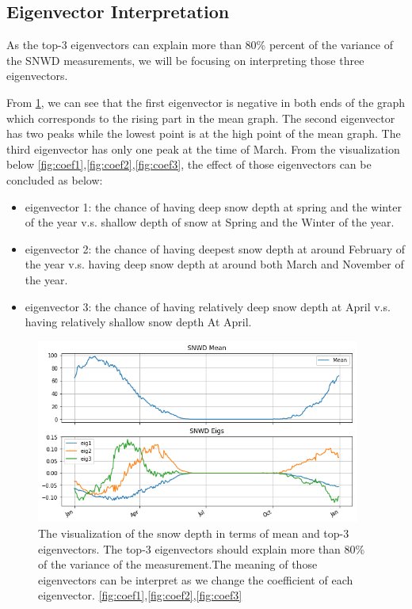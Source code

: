 \documentclass[a4paper]{article}
\begin{document}
\subsection{Eigenvector Interpretation}
As the top-3 eigenvectors can explain more than 80\% percent of the variance of the SNWD measurements, we will be focusing on interpreting those three eigenvectors.

From \ref{fig:eigen_snwd}, we can see that the first eigenvector is negative in both ends of the graph which corresponds to the rising part in the mean graph. The second eigenvector has two peaks while the lowest point is at the high point of the mean graph. The third eigenvector has only one peak at the time of March. 
\noindent From the visualization below \ref{fig:coef1},\ref{fig:coef2},\ref{fig:coef3}, the effect of those eigenvectors can be concluded as below:
\begin{itemize}
\item  eigenvector 1:  the chance of having deep snow depth at spring and the winter of the year v.s. shallow depth of snow at Spring and the Winter of the year.
\item  eigenvector 2: the chance of having deepest snow depth at around February of the year v.s. having deep snow depth at around both March and November of the year.
\item  eigenvector 3: the chance of having relatively deep snow depth at April v.s.  having relatively shallow snow depth At April.
\end{itemize}
\begin{figure}[!htp]
\centering
\includegraphics[width=0.95\textwidth]{SNWD.png}
\caption{\label{fig:eigen_snwd} The visualization of the snow depth in terms of mean and top-3 eigenvectors. The top-3 eigenvectors should explain more than 80\% of the variance of the measurement.The meaning of those eigenvectors can be interpret as we change the coefficient of each eigenvector. \ref{fig:coef1},\ref{fig:coef2},\ref{fig:coef3}}
\end{figure}
\end{document}
